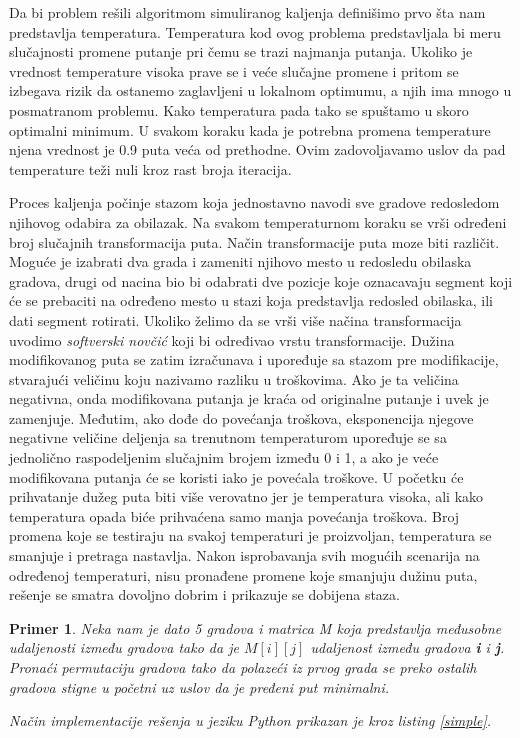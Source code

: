 \documentclass[a4paper]{article}
\newtheorem{primer}{Primer}[section]
\begin{document}
Da bi problem rešili algoritmom simuliranog kaljenja definišimo prvo šta nam predstavlja temperatura. Temperatura kod ovog problema predstavljala bi meru slučajnosti promene putanje pri čemu se trazi najmanja putanja. Ukoliko je vrednost temperature visoka prave se i veće slučajne promene i pritom se izbegava rizik da ostanemo zaglavljeni u lokalnom optimumu, a njih ima mnogo u posmatranom problemu. Kako temperatura pada tako se spuštamo u skoro optimalni minimum. U svakom koraku kada je potrebna promena temperature njena vrednost je 0.9 puta veća od prethodne. Ovim zadovoljavamo uslov da pad temperature teži nuli kroz rast broja iteracija.\par

Proces kaljenja počinje stazom koja jednostavno navodi sve gradove redosledom njihovog odabira za obilazak. Na svakom temperaturnom koraku se vrši određeni broj slučajnih transformacija puta. Način transformacije puta moze biti različit. Moguće je izabrati dva grada i zameniti njihovo mesto u redosledu obilaska gradova, drugi od nacina bio bi odabrati dve pozicje koje oznacavaju segment koji će se prebaciti na određeno mesto u stazi koja predstavlja redosled obilaska, ili dati segment rotirati. Ukoliko želimo da se vrši više načina transformacija uvodimo \emph{softverski novčić} koji bi određivao vrstu transformacije. 
 Dužina modifikovanog puta se zatim izračunava i upoređuje sa stazom pre modifikacije, stvarajući veličinu koju nazivamo razliku u troškovima. Ako je ta veličina negativna, onda modifikovana putanja je kraća od originalne putanje i uvek je zamenjuje. Međutim, ako dođe do povećanja troškova, eksponencija njegove negativne veličine deljenja sa trenutnom temperaturom upoređuje se sa jednolično raspodeljenim slučajnim brojem između 0 i 1, a ako je veće modifikovana putanja će se koristi iako je povećala troškove. U početku će prihvatanje dužeg puta biti više verovatno jer je temperatura visoka, ali kako temperatura opada biće prihvaćena samo manja povećanja troškova. Broj promena koje se testiraju na svakoj temperaturi je proizvoljan, temperatura se smanjuje i pretraga nastavlja. Nakon isprobavanja svih mogućih scenarija na određenoj temperaturi, nisu pronađene promene koje smanjuju dužinu puta, rešenje se smatra dovoljno dobrim i prikazuje se dobijena staza.

\begin{primer}
Neka nam je dato 5 gradova i matrica M koja predstavlja međusobne udaljenosti između gradova tako da je $M[i][j]$ udaljenost između gradova \textbf{i} i \textbf{j}. Pronaći permutaciju gradova tako da polazeći iz prvog grada se preko ostalih gradova stigne u početni uz uslov da je pređeni put minimalni.\par
Način implementacije rešenja u jeziku Python prikazan je kroz listing \ref{simple}. 
\end{primer}
\end{document}
